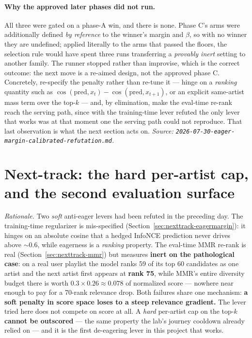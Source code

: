 \documentclass[11pt]{article}
\begin{document}
\paragraph{Why the approved later phases did not run.} All three were gated on a
phase-A win, and there is none. Phase C's arms were additionally defined \emph{by
reference} to the winner's margin and $\beta$, so with no winner they are
undefined; applied literally to the arms that passed the floors, the selection rule
would have spent three runs transferring a \emph{provably inert} setting to another
family. The runner stopped rather than improvise, which is the correct outcome: the
next move is a re-aimed design, not the approved phase C. Concretely, re-specify
the penalty rather than re-tune it --- hinge on a \emph{ranking} quantity such as
$\cos(\mathrm{pred}, x_t) - \cos(\mathrm{pred}, x_{t+1})$, or an explicit
same-artist mass term over the top-$k$ --- and, by elimination, make the eval-time
re-rank reach the serving path, since with the training-time lever refuted the only
lever that works was at that moment one the serving path could not reproduce. That
last observation is what the next section acts on.
\emph{Source: \texttt{2026-07-30-eager-margin-calibrated-refutation.md}.}

\section{Next-track: the hard per-artist cap, and the second evaluation surface}
\label{sec:nexttrack-artistcap}
\emph{Rationale.} Two \emph{soft} anti-eager levers had been refuted in the
preceding day. The training-time regularizer is mis-specified
(Section~\ref{sec:nexttrack-eagermargin}): it hinges on an absolute cosine that a
hedged InfoNCE prediction never drives above ${\sim}\num{0.6}$, while eagerness is
a \emph{ranking} property. The eval-time MMR re-rank is real
(Section~\ref{sec:nexttrack-mmr}) but measures \textbf{inert on the pathological
case}: on a real user playlist the model ranks \num{59} of its top \num{60}
candidates as one artist and the next artist first appears at \textbf{rank
\num{75}}, while MMR's entire diversity budget there is worth
$\num{0.3}\times\num{0.26}\approx\num{0.078}$ of normalized score --- nowhere near
enough to pay for a 70-rank relevance drop. Both failures share one mechanism:
\textbf{a soft penalty in score space loses to a steep relevance gradient.} The
lever tried here does not compete on score at all. A \emph{hard} per-artist cap on
the top-$k$ \textbf{cannot be outscored} --- the same property the lab's journey
cooldown already relied on --- and it is the first de-eagering lever in this project
that works.
\end{document}

